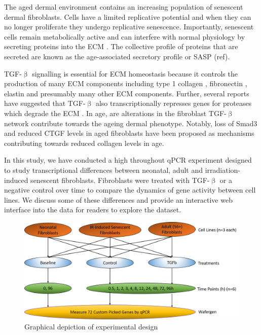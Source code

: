 \documentclass[alpha-refs]{wiley-article}
\newcommand{\tgf}{TGF-$\upbeta$}
\begin{document}
The aged dermal environment contains an increasing population of senescent dermal fibroblasts. Cells have a limited replicative potential and when they can no longer proliferate they undergo replicative senescence. Importantly, senescent cells remain metabolically active and can interfere with normal physiology by secreting proteins into the ECM \citep{Toutfaire2017}. The collective profile of proteins that are secreted are known as the age-associated secretory profile or SASP (ref). 

\tgf{} signalling is essential for ECM homeostasis because it controls the production of many ECM components including type 1 collagen \citep{Varani2006, Varga1987}, fibronectin \citep{Ignotz1986}, elastin \citep{Kuang2007} and presumably many other ECM components. Further, several reports have suggested that \tgf{} also transcriptionally represses genes for proteases which degrade the ECM \citep{White2000, Yuan2001, Edwards1996}. In age, are alterations in the fibroblast \tgf{} network contribute towards the ageing dermal phenotype. Notably, loss of Smad3 \citep{Purohit2016} and reduced CTGF levels in aged fibroblasts have been proposed as mechanisms contributing towards reduced collagen levels in age.

In this study, we have conducted a high throughout qPCR experiment designed to study transcriptional differences between neonatal, adult and irradiation-induced senescent fibroblasts. Fibroblasts were treated with \tgf{} or a negative control over time to compare the dynamics of gene activity between cell lines. We discuss some of these differences and provide an interactive web interface into the data for readers to explore the dataset. 

\begin{figure}
	\includegraphics[width=\textwidth]{img/ExperimentDesign}
	\caption{Graphical depiction of experimental design}
	\label{fig:exp_design}
\end{figure}
\end{document}

